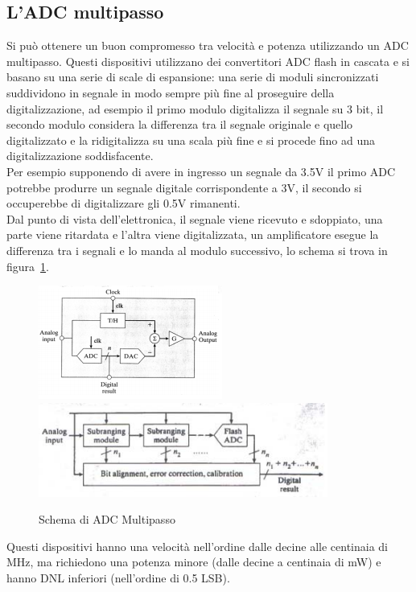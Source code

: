 \subsection{L'ADC multipasso}
Si pu\`o ottenere un buon compromesso tra velocit\`a e potenza utilizzando un ADC multipasso.
Questi dispositivi utilizzano dei convertitori ADC flash in cascata e si basano su una serie di scale di espansione:
una serie di moduli sincronizzati suddividono in segnale in modo sempre pi\`u fine al proseguire della digitalizzazione, 
ad esempio il primo modulo digitalizza il segnale su 3 bit, il secondo modulo considera la differenza tra il segnale originale e quello digitalizzato e la ridigitalizza
su una scala pi\`u fine e si procede fino ad una digitalizzazione soddisfacente.\\
Per esempio supponendo di avere in ingresso un segnale da 3.5V il primo ADC potrebbe produrre un segnale digitale corrispondente a 3V, il secondo
si occuperebbe di digitalizzare gli 0.5V rimanenti.\\
Dal punto di vista dell'elettronica, il segnale viene ricevuto e sdoppiato, una parte viene ritardata e l'altra viene digitalizzata, un amplificatore
esegue la differenza tra i segnali e lo manda al modulo successivo, lo schema si trova in figura~\ref{fig:ADCMultipasso}.
\begin{figure}[htbp]
\begin{center}
\includegraphics[scale=1]{./Immagini/ADCMultipasso1.png}\\
\includegraphics[scale=1]{./Immagini/ADCMultipasso2.png}
\caption{Schema di ADC Multipasso}
\label{fig:ADCMultipasso}
\end{center}
\end{figure}
Questi dispositivi hanno una velocit\`a nell'ordine dalle decine alle centinaia di MHz, ma richiedono una potenza minore (dalle decine a centinaia di mW)
e hanno DNL inferiori (nell'ordine di 0.5 LSB).
